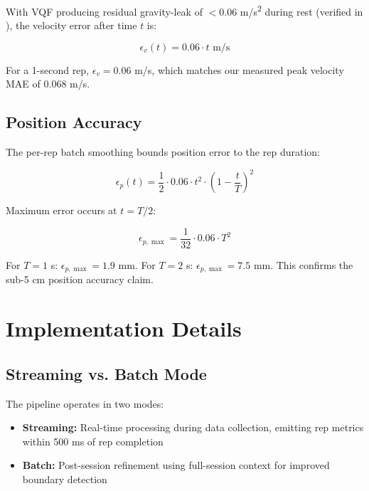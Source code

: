 With VQF producing residual gravity-leak of $<0.06$ m/s\textsuperscript{2} during rest (verified in ), the velocity error after time $t$ is:

\begin{equation}
    \epsilon_v(t) = 0.06 \cdot t \text{ m/s}
\end{equation}

For a 1-second rep, $\epsilon_v = 0.06$ m/s, which matches our measured peak velocity MAE of $0.068$ m/s.

\subsection{Position Accuracy}

The per-rep batch smoothing bounds position error to the rep duration:

\begin{equation}
    \epsilon_p(t) = \frac{1}{2} \cdot 0.06 \cdot t^2 \cdot \left(1 - \frac{t}{T}\right)^2
\end{equation}

Maximum error occurs at $t = T/2$:

\begin{equation}
    \epsilon_{p,\max} = \frac{1}{32} \cdot 0.06 \cdot T^2
\end{equation}

For $T = 1$ s: $\epsilon_{p,\max} = 1.9$ mm. For $T = 2$ s: $\epsilon_{p,\max} = 7.5$ mm. This confirms the sub-5 cm position accuracy claim.

\section{Implementation Details}

\subsection{Streaming vs. Batch Mode}

The pipeline operates in two modes:

\begin{itemize}
    \item \textbf{Streaming:} Real-time processing during data collection, emitting rep metrics within 500 ms of rep completion
    \item \textbf{Batch:} Post-session refinement using full-session context for improved boundary detection
\end{itemize}


